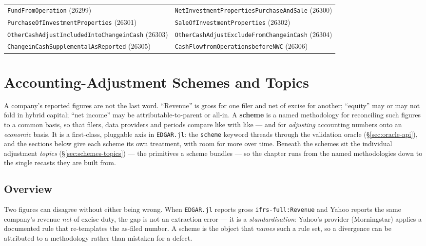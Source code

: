 \documentclass[11pt,a4paper]{report}
\begin{document}
\begin{subappendices}
{\begin{longtable}{@{}p{}p{}@{}}
\texttt{FundFromOperation} (26299) & \texttt{NetInvestmentPropertiesPurchaseAndSale} (26300) \\
\texttt{PurchaseOfInvestmentProperties} (26301) & \texttt{SaleOfInvestmentProperties} (26302) \\
\texttt{OtherCashAdjustIncludedIntoChangeinCash} (26303) & \texttt{OtherCashAdjustExcludeFromChangeinCash} (26304) \\
\texttt{ChangeinCashSupplementalAsReported} (26305) & \texttt{CashFlowfromOperationsbeforeNWC} (26306) \\
\bottomrule
\end{longtable}}
\end{subappendices}

\chapter{Accounting-Adjustment Schemes and Topics}
\label{sec:schemes}

A company's reported figures are not the last word. ``Revenue'' is gross for one filer and net of excise for
another; ``equity'' may or may not fold in hybrid capital; ``net income'' may be attributable-to-parent or
all-in. A \textbf{scheme} is a named methodology for reconciling such figures to a common basis, so that
filers, data providers and periods compare like with like --- and for \emph{adjusting} accounting numbers
onto an \emph{economic} basis. It is a first-class, pluggable axis in \texttt{EDGAR.jl}: the \texttt{scheme}
keyword threads through the validation oracle (\S\ref{sec:oracle-api}), and the sections below give each
scheme its own treatment, with room for more over time. Beneath the schemes sit the individual adjustment
\emph{topics} (\S\ref{sec:schemes-topics}) --- the primitives a scheme bundles --- so the chapter runs from the
named methodologies down to the single recasts they are built from.

\section{Overview}
\label{sec:schemes-overview}

Two figures can disagree without either being wrong. When \texttt{EDGAR.jl} reports gross
\texttt{ifrs-full:Revenue} and Yahoo reports the same company's revenue \emph{net} of excise duty, the gap is
not an extraction error --- it is a \emph{standardisation}: Yahoo's provider (Morningstar) applies a
documented rule that re-templates the as-filed number. A scheme is the object that \emph{names} such a rule
set, so a divergence can be attributed to a methodology rather than mistaken for a defect.
\end{document}
